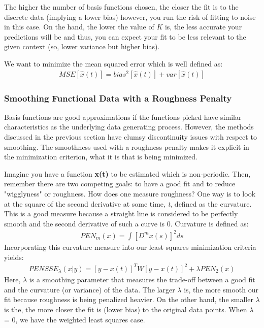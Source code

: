 \documentclass{article}
\begin{document}
\noindent The higher the number of basis functions chosen, the closer the fit is to the discrete data (implying a lower bias) however, you run the risk of fitting to noise in this case. On the hand, the lower the value of $K$ is, the less accurate your predictions will be and thus, you can expect your fit to be less relevant to the given context (so, lower variance but higher bias).

\noindent We want to minimize the mean squared error which is well defined as:
\begin{align}
MSE[\hat{x}(t)] = bias^2[\hat{x}(t)] + var[\hat{x}(t)]
\end{align}

\subsubsection{Smoothing Functional Data with a Roughness Penalty}

\noindent Basis functions are good approximations if the functions picked have similar characteristics as the underlying data generating process. However, the methods discussed in the previous section have clumsy discontinuity issues with respect to smoothing. The smoothness used with a roughness penalty makes it explicit in the minimization criterion, what it is that is being minimized. 

\noindent Imagine you have a function \textbf{x(t)} to be estimated which is non-periodic. Then, remember there are two competing goals: to have a good fit and to reduce "wigglyness" or roughness. How does one measure roughness? One way is to look at the square of the second derivative at some time, \textit{t}, defined as the curvature. This is a good measure because a straight line is considered to be perfectly smooth and the second derivative of such a curve is 0. Curvature is defined as:
\begin{align}
PEN_m(x) = \int[D^mx(s)]^2 ds
\end{align}
\noindent Incorporating this curvature measure into our least squares minimization criteria yields:
\begin{align}
PENSSE_\lambda(x|y) = [y - x(t)]^TW[y - x(t)]^2 + \lambda PEN_2(x)
\end{align}
\noindent Here, $\lambda$ is a smoothing parameter that measures the trade-off between a good fit and the curvature (or variance) of the data. The larger $\lambda$ is, the more smooth our fit because roughness is being penalized heavier. On the other hand, the smaller $\lambda$ is the, the more closer the fit is (lower bias) to the original data points. When $\lambda$ = 0, we have the weighted least squares case. 
\end{document}

